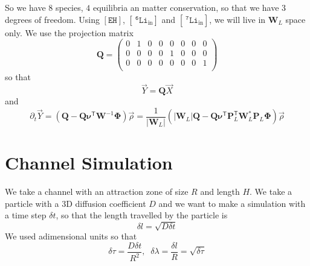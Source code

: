 \documentclass[aps,onecolumn,11pt]{revtex4}
\newcommand{\mychem}[1]{\mathtt{#1}}
\newcommand{\myconc}[1]{\left\lbrack{#1}\right\rbrack}
\newcommand{\spLi}[1]{{~^{\mychem{#1}}\mychem{Li}}}
\newcommand{\spLiIn}[1]{{\spLi{#1}}_{\mathrm{in}}}
\newcommand{\LiIn}[1]{\myconc{\spLiIn{#1}}}
\newcommand{\spEHin}{\mychem{EH}}
\newcommand{\EHin}{\myconc{\spEHin}}
\newcommand{\mytrn}[1]{{#1}^{\!\mathsf{T}}}
\newcommand{\mymat}[1]{{\bm{#1}}}
\newcommand{\mydet}[1]{{\left|{#1}\right|}}
\begin{document}
So we have $8$ species, $4$ equilibria an matter conservation, so that we have 3 degrees of freedom.
Using $\EHin$, $\LiIn{6}$ and $\LiIn{7}$, we will live in $\mymat{W}_L$ space only.
We use the projection matrix
\begin{equation}
	\mymat{Q} = 
	\begin{pmatrix}
	0 & 1 & 0 & 0 &0 & 0 & 0 & 0\\
	0 & 0 & 0 & 0 &1 & 0 & 0 & 0\\
	0 & 0 & 0 & 0 &0 & 0 & 0 & 1\\
	\end{pmatrix}
\end{equation}
so that
\begin{equation}
	\vec{Y} = \mymat{Q}\vec{X}
\end{equation}
and
\begin{equation}
	\partial_t \vec{Y} = 
	\left(
	\mymat{Q} - \mymat{Q} \mytrn{\mymat{\nu}} \mymat{W}^{-1} \mymat{\Phi} \right) \vec{\rho}
	=
	\dfrac{1}{\mydet{\mymat{W}_L}}
	\left(
		\mydet{\mymat{W}_L}\mymat{Q} - \mymat{Q} \mytrn{\mymat{\nu}} \mytrn{\mymat{P}}_L \mymat{W}_L^\ast \mymat{P}_L \mymat{\Phi} 
	\right)
	 \vec{\rho}
\end{equation}

\section{Channel Simulation}
We take a channel with an attraction zone of size $R$ and length $H$. We take a particle with a 3D diffusion coefficient $D$
and we want to make a simulation with a time step $\delta t$, so that the length travelled by the particle is
\begin{equation}
	\delta l = \sqrt{D\delta t}
\end{equation}
We used adimensional units so that 
\begin{equation}
	\delta \tau = \dfrac{D\delta t}{R^2},\;\;\delta \lambda = \dfrac{\delta l}{R} = \sqrt{\delta \tau}
\end{equation}
\end{document}
